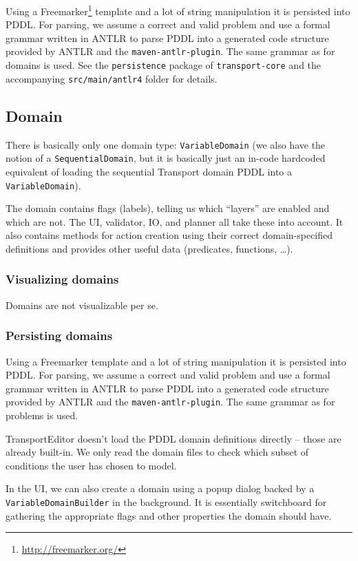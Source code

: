 Using a Freemarker\footnote{\url{http://freemarker.org/}} template and a lot of string manipulation it is persisted into PDDL.
For parsing, we assume a correct and valid problem and use a formal grammar written in ANTLR to parse PDDL into a generated code structure provided by ANTLR and the \texttt{maven-antlr-plugin}. The same grammar as for
domains is used. See the \texttt{persistence} package of \verb+transport-core+ and the accompanying \texttt{src/main/antlr4} folder for details.

\subsection*{Domain}
There is basically only one domain type: \texttt{VariableDomain} (we also have the notion of a \texttt{SequentialDomain},
but it is basically just an in-code hardcoded equivalent of loading the sequential Transport domain PDDL
into a \texttt{VariableDomain}).

The domain contains flags (labels), telling us which ``layers'' are enabled and which are not.
The UI, validator, IO, and planner all take these into account.
It also contains methods for action creation using their correct domain-specified definitions
and provides other useful data (predicates, functions, \ldots).

\subsubsection*{Visualizing domains}

Domains are not visualizable per se.

\subsubsection*{Persisting domains}
Using a Freemarker template and a lot of string manipulation it is persisted into PDDL.
For parsing, we assume a correct and valid problem and use a formal grammar written in ANTLR
to parse PDDL into a generated code structure provided by ANTLR and the \texttt{maven-antlr-plugin}. The same grammar as for
problems is used.

TransportEditor doesn't load the PDDL domain definitions directly -- those are already built-in.
We only read the domain files to check which subset of conditions the user has chosen to model.

In the UI, we can also create a domain using a popup dialog backed by a \texttt{VariableDomainBuilder} in the background.
It is essentially switchboard for gathering the appropriate flags and other properties the domain should have.


